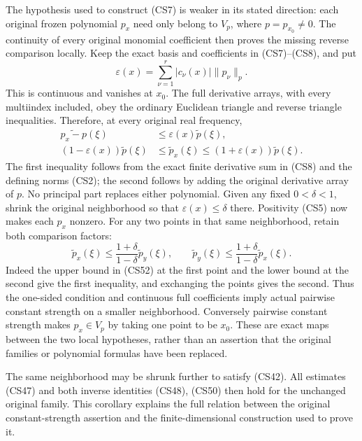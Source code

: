 \documentclass[
  11pt,
]{article}
\makeatletter
\let\ReaderOriginalAnchorStart\hyper@anchorstart
\let\ReaderOriginalAnchorEnd\hyper@anchorend
\let\ReaderPendingAliases\@empty
\def\ReaderArmAliases#1{\gdef\ReaderPendingAliases{#1}}
\def\hyper@anchorstart#1{\ReaderIfNativeAnchorTF{#1}{\ReaderPendingAliases\global\let\ReaderPendingAliases\@empty}{}\ReaderOriginalAnchorStart{#1}}
\makeatother
\begin{document}
The hypothesis used to construct (CS7) is weaker in its stated
direction: each original frozen polynomial \(p_x\) need only belong to
\(V_p\), where \(p=p_{x_0}\ne0\). The continuity of every original
monomial coefficient then proves the missing reverse comparison locally.
Keep the exact basis and coefficients in (CS7)--(CS8), and put \[
 \varepsilon(x)=\sum_{\nu=1}^r |c_\nu(x)|\|p_\nu\|_p.
 \tag{CS51}
\] This is continuous and vanishes at \(x_0\). The full derivative
arrays, with every multiindex included, obey the ordinary Euclidean
triangle and reverse triangle inequalities. Therefore, at every original
real frequency, \[
 \begin{split}
 \widetilde{p_x-p}(\xi)&\leq\varepsilon(x)\widetilde p(\xi),\\
 (1-\varepsilon(x))\widetilde p(\xi)
 &\leq\widetilde p_x(\xi)
 \leq(1+\varepsilon(x))\widetilde p(\xi).
 \end{split}\tag{CS52}
\] The first inequality follows from the exact finite derivative sum in
(CS8) and the defining norms (CS2); the second follows by adding the
original derivative array of \(p\). No principal part replaces either
polynomial. Given any fixed \(0<\delta<1\), shrink the original
neighborhood so that \(\varepsilon(x)\leq\delta\) there. Positivity
(CS5) now makes each \(p_x\) nonzero. For any two points in that same
neighborhood, retain both comparison factors: \[
 \widetilde p_x(\xi)
 \leq\frac{1+\delta}{1-\delta}\widetilde p_y(\xi),
 \qquad
 \widetilde p_y(\xi)
 \leq\frac{1+\delta}{1-\delta}\widetilde p_x(\xi).
 \tag{CS53}
\] Indeed the upper bound in (CS52) at the first point and the lower
bound at the second give the first inequality, and exchanging the points
gives the second. Thus the one-sided condition and continuous full
coefficients imply actual pairwise constant strength on a smaller
neighborhood. Conversely pairwise constant strength makes \(p_x\in V_p\)
by taking one point to be \(x_0\). These are exact maps between the two
local hypotheses, rather than an assertion that the original families or
polynomial formulas have been replaced.

The same neighborhood may be shrunk further to satisfy (CS42). All
estimates (CS47) and both inverse identities (CS48), (CS50) then hold
for the unchanged original family. This corollary explains the full
relation between the original constant-strength assertion and the
finite-dimensional construction used to prove it.

\ReaderArmAliases{\ReaderOriginalAnchorStart{the-selected-circles-for-an-original-polynomial}\ReaderOriginalAnchorEnd}
\end{document}
